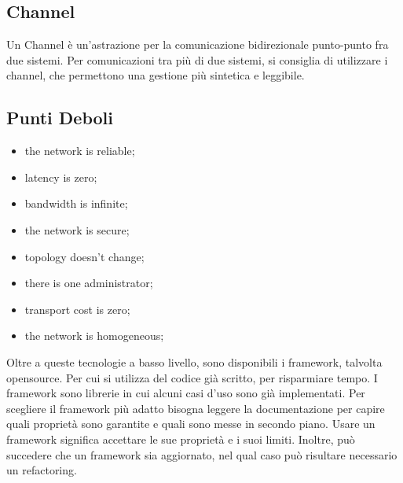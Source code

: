 \documentclass{article}
\begin{document}
\subsection{Channel}
Un Channel è un'astrazione per la comunicazione bidirezionale punto-punto fra
due sistemi. Per comunicazioni tra più di due sistemi, si consiglia di
utilizzare i channel, che permettono una gestione più sintetica e leggibile.

\subsection{Punti Deboli}
\begin{itemize}
	\item the network is reliable;

	\item latency is zero;

	\item bandwidth is infinite;

	\item the network is secure;

	\item topology doesn't change;

	\item there is one administrator;

	\item transport cost is zero;

	\item the network is homogeneous;
\end{itemize}

Oltre a queste tecnologie a basso livello, sono disponibili i framework,
talvolta opensource. Per cui si utilizza del codice già scritto, per risparmiare
tempo. I framework sono librerie in cui alcuni casi d'uso sono già implementati.
Per scegliere il framework più adatto bisogna leggere la documentazione per
capire quali proprietà sono garantite e quali sono messe in secondo piano. Usare
un framework significa accettare le sue proprietà e i suoi limiti. Inoltre, può
succedere che un framework sia aggiornato, nel qual caso può risultare
necessario un refactoring.\\
\end{document}
